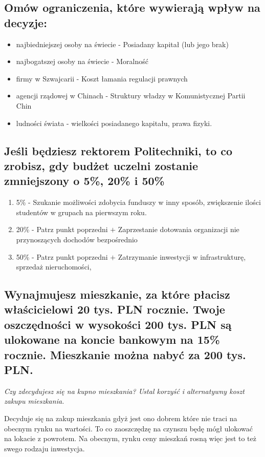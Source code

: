 \documentclass[a4paper,12pt]{article}
\begin{document}
\subsection{Omów ograniczenia, które wywierają wpływ na decyzje:}

\begin{itemize}
	\item najbiedniejszej osoby na świecie - Posiadany kapitał (lub jego brak)
	\item najbogatszej osoby na świecie - Moralność
	\item firmy w Szwajcarii - Koszt łamania regulacji prawnych
	\item agencji rządowej w Chinach - Struktury władzy w Komunistycznej Partii Chin
	\item ludności świata - wielkości posiadanego kapitału, prawa fizyki.
\end{itemize}

\subsection{Jeśli będziesz rektorem Politechniki, to co zrobisz, gdy budżet uczelni zostanie zmniejszony o 5\%, 20\% i 50\%}

\begin{enumerate}
	\item 5\% - Szukanie możliwości zdobycia funduszy w inny sposób, zwiększenie ilości studentów w grupach na pierwszym roku.
	\item 20\% - Patrz punkt poprzedni $+$ Zaprzestanie dotowania organizacji nie przynoszących dochodów bezpośrednio
	\item 50\% - Patrz punkt poprzedni $+$ Zatrzymanie inwestycji w infrastrukturę, sprzedaż nieruchomości,
\end{enumerate}

\subsection{Wynajmujesz mieszkanie, za które płacisz właścicielowi 20 tys. PLN rocznie. Twoje oszczędności w wysokości 200 tys. PLN są ulokowane na koncie ban­kowym na 15\% rocznie. Mieszkanie można nabyć za 200 tys. PLN.}

\emph{Czy zdecydujesz się na kupno mieszkania? Ustal korzyść i alternatywny koszt zakupu mieszkania.}


Decyduje się na zakup mieszkania gdyż jest ono dobrem które nie traci na obecnym rynku na wartości. To co zaoszczędzę na czynszu będę mógł ulokować na lokacie z powrotem. Na obecnym, rynku ceny mieszkań rosną więc jest to też swego rodzaju inwestycja.
\end{document}

